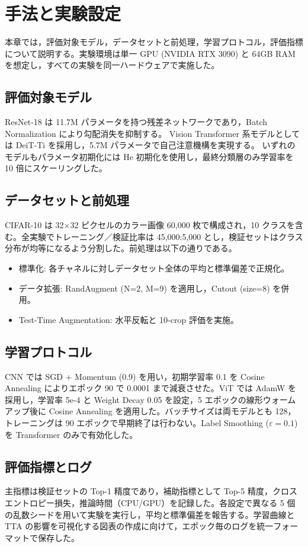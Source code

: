 \section{手法と実験設定}\label{sec:method}
本章では，評価対象モデル，データセットと前処理，学習プロトコル，評価指標について説明する。実験環境は単一 GPU (NVIDIA RTX 3090) と 64GB RAM を想定し，すべての実験を同一ハードウェアで実施した。

\subsection{評価対象モデル}
ResNet-18 は 11.7M パラメータを持つ残差ネットワークであり，Batch Normalization により勾配消失を抑制する。\cite{he2016deep} Vision Transformer 系モデルとしては DeiT-Ti を採用し，5.7M パラメータで自己注意機構を実現する。\cite{touvron2021training} いずれのモデルもパラメータ初期化には He 初期化を使用し，最終分類層のみ学習率を 10 倍にスケーリングした。

\subsection{データセットと前処理}
CIFAR-10 は 32$\times$32 ピクセルのカラー画像 60,000 枚で構成され，10 クラスを含む。全実験でトレーニング／検証比率は 45,000:5,000 とし，検証セットはクラス分布が均等になるよう分割した。前処理は以下の通りである。
\begin{itemize}
  \item 標準化: 各チャネルに対しデータセット全体の平均と標準偏差で正規化。
  \item データ拡張: RandAugment (N=2, M=9) を適用し，Cutout (size=8) を併用。\cite{cubuk2020randaugment}
  \item Test-Time Augmentation: 水平反転と 10-crop 評価を実施。
\end{itemize}

\subsection{学習プロトコル}
CNN では SGD + Momentum (0.9) を用い，初期学習率 0.1 を Cosine Annealing によりエポック 90 で 0.0001 まで減衰させた。ViT では AdamW を採用し，学習率 5e-4 と Weight Decay 0.05 を設定，5 エポックの線形ウォームアップ後に Cosine Annealing を適用した。バッチサイズは両モデルとも 128，トレーニングは 90 エポックで早期終了は行わない。Label Smoothing ($\varepsilon=0.1$) を Transformer のみで有効化した。\cite{muller2019does}

\subsection{評価指標とログ}
主指標は検証セットの Top-1 精度であり，補助指標として Top-5 精度，クロスエントロピー損失，推論時間（CPU/GPU）を記録した。各設定で異なる 5 個の乱数シードを用いて実験を実行し，平均と標準偏差を報告する。学習曲線と TTA の影響を可視化する図表の作成に向けて，エポック毎のログを統一フォーマットで保存した。


